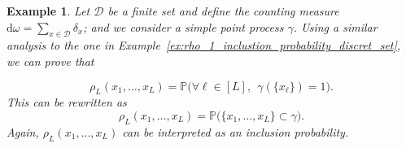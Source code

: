 \documentclass[twoside,11pt]{book}
\newtheorem{example}{Example}
\numberwithin{theorem}{chapter}
\numberwithin{definition}{chapter}
\numberwithin{proposition}{chapter}
\numberwithin{corollary}{chapter}
\numberwithin{example}{chapter}
\numberwithin{lemma}{chapter}
\numberwithin{assumption}{chapter}
\begin{document}
\begin{example}\label{ex:rho_L_inclustion_probability_discret_set}
Let $\mathcal{D}$ be a finite set and define the counting measure $\mathrm{d}\omega = \sum\limits_{x \in \mathcal{D}} \delta_x$; and we consider a simple point process $\gamma$. Using a similar analysis to the one in Example~\ref{ex:rho_1_inclustion_probability_discret_set}, we can prove that

\begin{equation}
\rho_{L}(x_{1}, \dots, x_{L}) = \mathbb{P} \big(\forall \ell \in [L], \:\: \gamma(\{x_\ell\}) = 1 \big).
\end{equation}
This can be rewritten as
\begin{equation}
\rho_{L}(x_{1}, \dots, x_{L}) = \mathbb{P} \big(\{x_{1}, \dots, x_{L} \} \subset \gamma \big).
\end{equation}
Again, $\rho_{L}(x_{1}, \dots, x_{L})$ can be interpreted as an inclusion probability.
\end{example}
\end{document}
